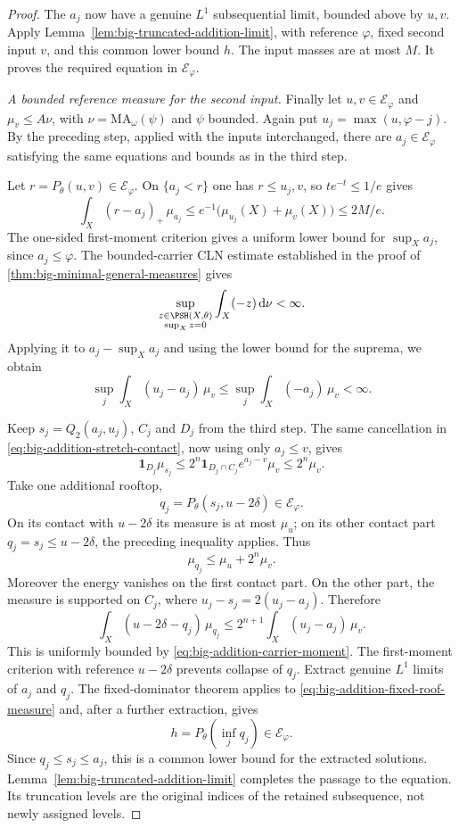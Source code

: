\begin{proof}
The $a_j$ now have a genuine $L^1$ subsequential limit, bounded above by $u,v$. Apply Lemma~\ref{lem:big-truncated-addition-limit}, with reference $\varphi$, fixed second input $v$, and this common lower bound $h$. The input masses are at most $M$. It proves the required equation in $\mathcal E_\varphi$.

\emph{A bounded reference measure for the second input.}
Finally let $u,v\in\mathcal E_\varphi$ and $\mu_v\leq A\nu$, with $\nu=\mathrm{MA}_\omega(\psi)$ and $\psi$ bounded. Again put $u_j=\max(u,\varphi-j)$. By the preceding step, applied with the inputs interchanged, there are $a_j\in\mathcal E_\varphi$ satisfying the same equations and bounds as in the third step.

Let $r=P_\theta(u,v)\in\mathcal E_\varphi$. On $\{a_j<r\}$ one has $r\leq u_j,v$, so $t e^{-t}\leq1/e$ gives
\[
 \int_X(r-a_j)_+\,\mu_{a_j}
 \leq e^{-1}\bigl(\mu_{u_j}(X)+\mu_v(X)\bigr)\leq2M/e.
\]
The one-sided first-moment criterion gives a uniform lower bound for $\sup_Xa_j$, since $a_j\leq\varphi$. The bounded-carrier CLN estimate established in the proof of \cref{thm:big-minimal-general-measures} gives
\[
 \sup_{\substack{z\in\PSH(X,\theta)\\\sup_Xz=0}}
       \int_X(-z)\,\mathrm{d}\nu<\infty.
\]
Applying it to $a_j-\sup_Xa_j$ and using the lower bound for the suprema, we obtain
\begin{equation}\label{eq:big-addition-carrier-moment}
 \sup_j\int_X(u_j-a_j)\,\mu_v
 \leq\sup_j\int_X(-a_j)\,\mu_v<\infty.
\end{equation}

Keep $s_j=Q_2(a_j,u_j)$, $C_j$ and $D_j$ from the third step. The same cancellation in \eqref{eq:big-addition-stretch-contact}, now using only $a_j\leq v$, gives
\[
 \mathbf1_{D_j}\mu_{s_j}
 \leq2^n\mathbf1_{D_j\cap C_j}e^{a_j-v}\mu_v
 \leq2^n\mu_v.
\]
Take one additional rooftop,
\[
 q_j=P_\theta(s_j,u-2\delta)\in\mathcal E_\varphi.
\]
On its contact with $u-2\delta$ its measure is at most $\mu_u$; on its other contact part $q_j=s_j\leq u-2\delta$, the preceding inequality applies. Thus
\begin{equation}\label{eq:big-addition-fixed-roof-measure}
 \mu_{q_j}\leq\mu_u+2^n\mu_v.
\end{equation}
Moreover the energy vanishes on the first contact part. On the other part, the measure is supported on $C_j$, where $u_j-s_j=2(u_j-a_j)$. Therefore
\[
 \int_X(u-2\delta-q_j)\,\mu_{q_j}
 \leq2^{n+1}\int_X(u_j-a_j)\,\mu_v.
\]
This is uniformly bounded by \eqref{eq:big-addition-carrier-moment}. The first-moment criterion with reference $u-2\delta$ prevents collapse of $q_j$. Extract genuine $L^1$ limits of $a_j$ and $q_j$. The fixed-dominator theorem applies to \eqref{eq:big-addition-fixed-roof-measure} and, after a further extraction, gives
\[
 h=P_\theta\left(\inf_jq_j\right)\in\mathcal E_\varphi.
\]
Since $q_j\leq s_j\leq a_j$, this is a common lower bound for the extracted solutions. Lemma~\ref{lem:big-truncated-addition-limit} completes the passage to the equation. Its truncation levels are the original indices of the retained subsequence, not newly assigned levels.


\end{proof}
